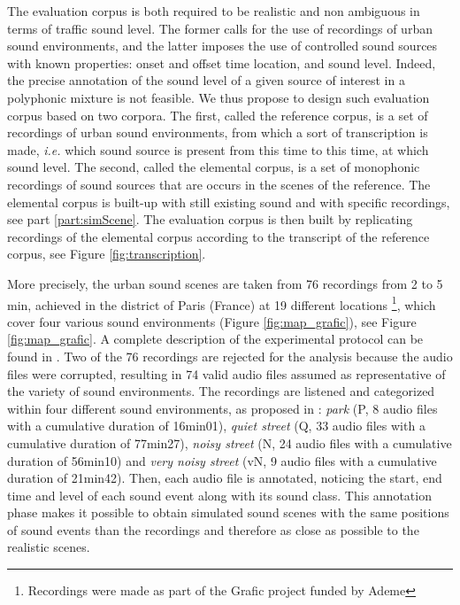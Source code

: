 \documentclass[review,5p,twocolumn,sort&compress,times]{elsarticle}
\begin{document}
The evaluation corpus is both required to be realistic and non ambiguous in terms of traffic sound level. The former calls for the use of recordings of urban sound environments, and the latter imposes the use of controlled sound sources with known properties: onset and offset time location, and sound level. Indeed, the precise annotation of the sound level of a given source of interest in a polyphonic mixture is not feasible. We thus propose to design such evaluation corpus based on two corpora. The first, called the reference corpus, is a set of recordings of urban sound environments, from which a sort of transcription is made, \textit{i.e.} which sound source is present from this time to this time, at which sound level. The second, called the elemental corpus, is a set of monophonic recordings of sound sources that are occurs in the scenes of the reference. The elemental corpus is built-up with still existing sound and with specific recordings, see part \ref{part:simScene}. The evaluation corpus is then built by replicating recordings of the elemental corpus according to the transcript of the reference corpus, see Figure \ref{fig:transcription}.

More precisely, the urban sound scenes are taken from 76 recordings from 2 to 5 min, achieved in the  district of Paris (France) at 19 different locations \footnote{Recordings were made as part of the Grafic project funded by Ademe}, which cover four various sound environments (Figure \ref{fig:map_grafic}), see Figure \ref{fig:map_grafic}. A complete description of the experimental protocol can be found in \cite{aumond_modelling_2017}. Two of the 76 recordings are rejected for the analysis because the audio files were corrupted, resulting in 74 valid audio files assumed as representative of the variety of sound environments. The recordings are listened and categorized within four different sound environments, as proposed in \cite{can_describing_2015}: \textit{park} (P, 8 audio files with a cumulative duration of 16min01), \textit{quiet street} (Q, 33 audio files with a cumulative duration of 77min27), \textit{noisy street} (N, 24 audio files with a cumulative duration of 56min10) and \textit{very noisy street} (vN, 9 audio files with a cumulative duration of 21min42). Then, each audio file is annotated, noticing the start, end time and level of each sound event along with its sound class. This annotation phase makes it possible to obtain simulated sound scenes with the same positions of sound events than the recordings and therefore as close as possible to the realistic scenes.
\end{document}
